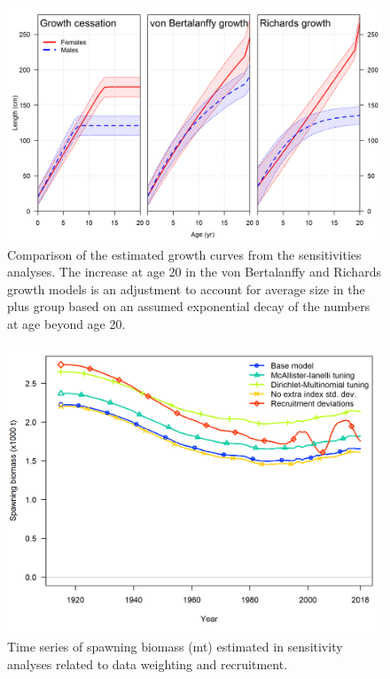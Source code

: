 \documentclass[12pt,]{article}
\begin{document}
\begin{figure}
\centering
\includegraphics{Figures/growth_curve_comparison.png}
\caption{Comparison of the estimated growth curves from the
sensitivities analyses. The increase at age 20 in the von Bertalanffy
and Richards growth models is an adjustment to account for average size
in the plus group based on an assumed exponential decay of the numbers
at age beyond age 20.\label{fig:growth_curve_comparison}}
\end{figure}

\begin{figure}
\centering
\includegraphics{Figures/sens.misc_compare1_spawnbio.png}
\caption{Time series of spawning biomass (mt) estimated in sensitivity
analyses related to data weighting and recruitment.
\label{fig:Sensitivity_misc}}
\end{figure}
\end{document}
